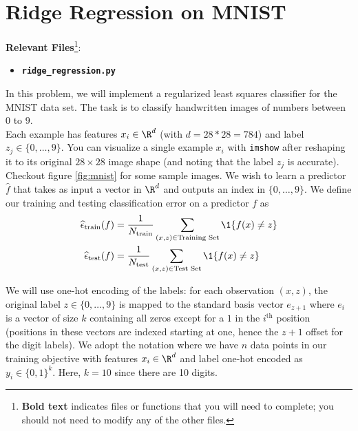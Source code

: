 \documentclass{article}
\begin{document}
\section*{Ridge Regression on MNIST}
{\bf Relevant Files}\footnote{{\bf Bold text} indicates files or functions that you will need to complete; you should not need to modify any of the other files.}:
\vspace{-1.2em}
\begin{multicols}{2}
    \begin{itemize}[noitemsep,nolistsep]
        \item \texttt{\bf ridge\_regression.py}
    \end{itemize}
\end{multicols}
\begin{aprob}
    In this problem, we will implement a regularized least squares classifier for the MNIST data set. The task
    is to classify handwritten images of numbers between $0$ to $9$.\\
    
    Each example has features $x_i \in \R^d$ (with $d=28*28=784$) and label $z_j \in \{0,\dots,9\}$. You can visualize a single example $x_i$ with \texttt{imshow} after reshaping it to its original $28 \times 28$ image shape (and noting that the label $z_j$ is accurate). Checkout figure \ref{fig:mnist} for some sample images. We wish to learn a predictor $\widehat{f}$ that takes as input a vector in $\R^d$ and outputs an index in $\{0,\dots,9\}$. We define our training and testing classification error on a predictor $f$ as
    \begin{align*}
        \widehat{\epsilon}_{\textrm{train}}(f) &=
        \frac{1}{N _{\textrm{train}}} \sum_{(x,z)\in \textrm{Training Set}}     \1\{ f(x) \neq z \}
        \\
          \widehat{\epsilon}_{\textrm{test}}(f) &=
          \frac{1}{N _{\textrm{test}}} \sum_{(x,z)\in \textrm{Test Set}}     \1\{ f(x) \neq z \} 
    \end{align*}
    
    We will use one-hot encoding of the labels: for each observation $(x,z)$, the original label $z \in \{0, \ldots, 9\}$ is mapped to the standard basis vector $e_{z+1}$ where $e_i$ is a vector of size $k$ containing all zeros except for a $1$ in the $i^{\textrm{th}}$ position (positions in these vectors are indexed starting at one, hence the $z+1$ offset for the digit labels). We adopt the notation where we have $n$ data points in our training objective with features $x_i \in \R^d$ and label one-hot encoded as $y_i \in \{0,1\}^k$. Here, $k=10$ since there are 10 digits.
    

\end{aprob}
\end{document}
